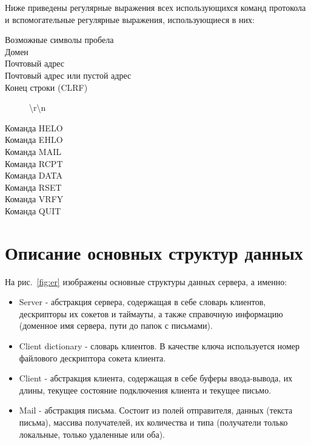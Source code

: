\documentclass[a4paper,12pt]{report}
\begin{document}
Ниже приведены регулярные выражения всех использующихся команд протокола и вспомогательные регулярные выражения, использующиеся в них:
\begin{description}
    \item[Возможные символы пробела]
    
    \item[Домен]
    
    \item[Почтовый адрес]
    
    \item[Почтовый адрес или пустой адрес]
    
    \item[Конец строки (CLRF)]
    \textbackslash r\textbackslash n
    \item[Команда HELO]
    
    \item[Команда EHLO]
    
    \item[Команда MAIL]
    
    \item[Команда RCPT]
    
    \item[Команда DATA]
    
    \item[Команда RSET]
    
    \item[Команда VRFY]
    
    \item[Команда QUIT]
    
\end{description}


\section{Описание основных структур данных}

На рис.~\ref{fig:er} изображены основные структуры данных сервера, а именно:
\begin{itemize}
    \item Server - абстракция сервера, содержащая в себе словарь клиентов, дескрипторы их сокетов и таймауты, а также справочную информацию (доменное имя сервера, пути до папок с письмами).
    \item Client dictionary - словарь клиентов. В качестве ключа используется номер файлового дескриптора сокета клиента.
    \item Client - абстракция клиента, содержащая в себе буферы ввода-вывода, их длины, текущее состояние подключения клиента и текущее письмо.
    \item Mail - абстракция письма. Состоит из полей отправителя, данных (текста письма), массива получателей, их количества и типа (получатели только локальные, только удаленные или оба).
\end{itemize}
\end{document}
